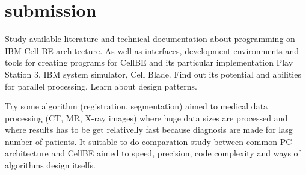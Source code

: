 \section*{submission}
Study available literature and technical documentation about programming on IBM Cell BE architecture. As well as interfaces, development environments and tools for creating programs for CellBE and its particular implementation Play Station 3, IBM system simulator, Cell Blade. Find out its potential and abilities for parallel processing. Learn about design patterns.

Try some algorithm (registration, segmentation) aimed to medical data processing (CT, MR, X-ray images) where huge data sizes are processed and where results has to be get relativelly fast because diagnosis are made for lasg number of patients. It suitable to do comparation study between common PC architecture and CellBE aimed to speed, precision, code complexity and ways of algorithms design itselfs. 
